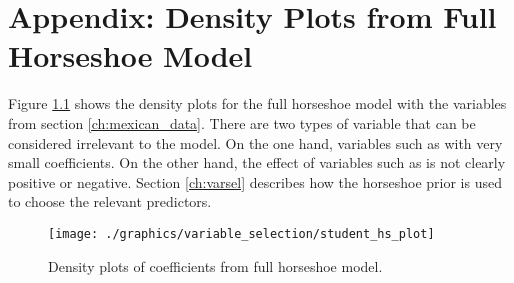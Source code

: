 \chapter{Appendix: Density Plots from Full Horseshoe Model}
\label{appendix:horseshoe_plot}

Figure \ref{fig:hs_dens} shows the density plots for the full horseshoe model with the variables from section \ref{ch:mexican_data}.
There are two types of variable that can be considered irrelevant to the model.
On the one hand, variables such as  with very small coefficients.
On the other hand, the effect of variables such as  is not clearly positive or negative.
Section \ref{ch:varsel} describes how the horseshoe prior is used to choose the relevant predictors.

\begin{figure}[h]
    \texttt{[image: ./graphics/variable\_selection/student\_hs\_plot]}
    \caption{Density plots of coefficients from full horseshoe model.}
    \label{fig:hs_dens}
\end{figure}
